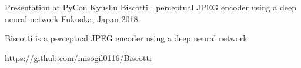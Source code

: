 \begin{cventries}
  \cventry
    {Presentation at PyCon Kyushu} %
    {Biscotti : perceptual JPEG encoder using a deep neural network} %
    {Fukuoka, Japan} %
    {2018} %
    {
      \begin{cvitems} %
        \item {Biscotti is a perceptual JPEG encoder using a deep neural network}
        \item {https://github.com/misogil0116/Biscotti}
      \end{cvitems}
    }
\end{cventries}